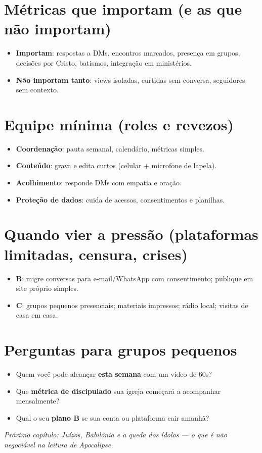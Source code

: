 \section{Métricas que importam (e as que não importam)}
\begin{itemize}[leftmargin=*,noitemsep]
  \item \textbf{Importam}: respostas a DMs, encontros marcados, presença em grupos, decisões por Cristo, batismos, integração em ministérios.
  \item \textbf{Não importam tanto}: views isoladas, curtidas sem conversa, seguidores sem contexto.
\end{itemize}

\section{Equipe mínima (roles e revezos)}
\begin{checklist}
\begin{itemize}[leftmargin=*,noitemsep]
  \item \textbf{Coordenação}: pauta semanal, calendário, métricas simples.
  \item \textbf{Conteúdo}: grava e edita curtos (celular + microfone de lapela).
  \item \textbf{Acolhimento}: responde DMs com empatia e oração.
  \item \textbf{Proteção de dados}: cuida de acessos, consentimentos e planilhas.
\end{itemize}
\end{checklist}

\section{Quando vier a pressão (plataformas limitadas, censura, crises)}
\begin{checklist}[title={Planos B/C}]
\begin{itemize}[leftmargin=*,noitemsep]
  \item \textbf{B}: migre conversas para e-mail/WhatsApp com consentimento; publique em site próprio simples.
  \item \textbf{C}: grupos pequenos presenciais; materiais impressos; rádio local; visitas de casa em casa.
\end{itemize}
\end{checklist}

\section{Perguntas para grupos pequenos}
\begin{itemize}[leftmargin=*,noitemsep]
  \item Quem você pode alcançar \textbf{esta semana} com um vídeo de 60s?
  \item Que \textbf{métrica de discipulado} sua igreja começará a acompanhar mensalmente?
  \item Qual o seu \textbf{plano B} se sua conta ou plataforma cair amanhã?
\end{itemize}

\bigskip
\noindent\textit{Próximo capítulo: Juízos, Babilônia e a queda dos ídolos — o que é não negociável na leitura de Apocalipse.}
